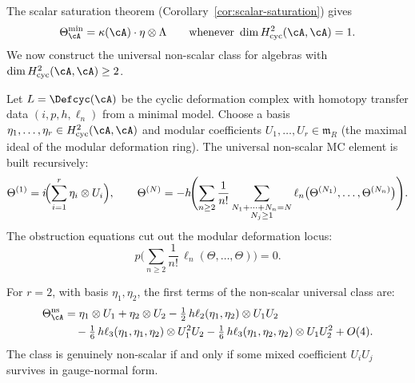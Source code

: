 The scalar saturation theorem
(Corollary~\ref{cor:scalar-saturation}) gives
\[
\Theta_\cA^{\min} = \kappa(\cA) \cdot \eta \otimes \Lambda
\qquad\text{whenever } \dim H^2_{\mathrm{cyc}}(\cA,\cA) = 1.
\]
We now construct the universal non-scalar class
for algebras with
$\dim H^2_{\mathrm{cyc}}(\cA,\cA) \geq 2$.

\begin{construction}
\label{constr:non-scalar-hpt}
Let $L = \Defcyc(\cA)$ be the cyclic deformation complex
with homotopy transfer data $(i,p,h,\ell_n)$ from a
minimal model.  Choose a basis
$\eta_1, \ldots, \eta_r \in H^2_{\mathrm{cyc}}(\cA,\cA)$
and modular coefficients $U_1, \ldots, U_r \in \mathfrak{m}_{R}$
(the maximal ideal of the modular deformation ring).
The universal non-scalar MC element is built recursively:
\begin{equation}\label{eq:hpt-nonscalar-recursion}
\Theta^{(1)} = i\!\Bigl(\sum_{i=1}^r \eta_i \otimes U_i\Bigr),
\qquad
\Theta^{(N)} = -h\!\Biggl(
  \sum_{n \geq 2} \frac{1}{n!}
  \sum_{\substack{N_1 + \cdots + N_n = N \\ N_j \geq 1}}
  \ell_n\bigl(\Theta^{(N_1)}, \ldots, \Theta^{(N_n)}\bigr)
\Biggr).
\end{equation}
The obstruction equations cut out the modular deformation locus:
\[
p\!\Biggl(
  \sum_{n \geq 2} \frac{1}{n!}\,
  \ell_n(\Theta, \ldots, \Theta)
\Biggr) = 0.
\]
\end{construction}

\begin{example}
\label{ex:two-channel-nonscalar}
For $r = 2$, with basis $\eta_1, \eta_2$, the first
terms of the non-scalar universal class are:
\begin{equation}\label{eq:two-channel-explicit}
\begin{split}
\Theta_\cA^{\mathrm{ns}}
&= \eta_1 \otimes U_1
  + \eta_2 \otimes U_2
  - \tfrac{1}{2}\,h\ell_2(\eta_1,\eta_2)
    \otimes U_1 U_2 \\
&\quad - \tfrac{1}{6}\,h\ell_3(\eta_1,\eta_1,\eta_2)
    \otimes U_1^2 U_2
  - \tfrac{1}{6}\,h\ell_3(\eta_1,\eta_2,\eta_2)
    \otimes U_1 U_2^2
  + O(4).
\end{split}
\end{equation}
The class is genuinely non-scalar if and only if some mixed
coefficient $U_i U_j$ survives in gauge-normal form.
\end{example}

